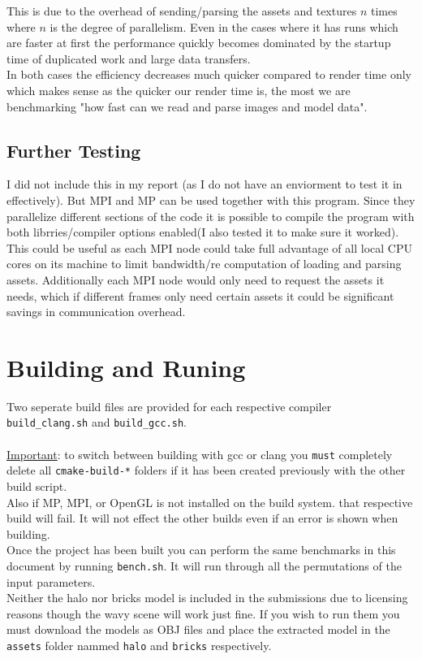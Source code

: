 \documentclass[12pt]{article}
\begin{document}
This is due to the overhead of sending/parsing the assets and textures $n$ times where $n$ is the degree of parallelism. Even in the cases where it has runs which are faster at first the performance quickly becomes dominated by the startup time of duplicated work and large data transfers. \\

In both cases the efficiency decreases much quicker compared to render time only which makes sense as the quicker our render time is, the most we are benchmarking "how fast can we read and parse images and model data". 

\subsection{Further Testing}
I did not include this in my report (as I do not have an enviorment to test it in effectively). But MPI and MP can be used together with this program. Since they parallelize different sections of the code it is possible to compile the program with both librries/compiler options enabled(I also tested it to make sure it worked). This could be useful as each MPI node could take full advantage of all local CPU cores on its machine to limit bandwidth/re computation of loading and parsing assets. Additionally each MPI node would only need to request the assets it needs, which if different frames only need  certain assets it could be significant savings in communication overhead.

\section{Building and Runing}

Two seperate build files are provided for each respective compiler \texttt{build\_clang.sh} and \texttt{build\_gcc.sh}. \\
\\
\underline{Important}: to switch between building with gcc or clang you \texttt{must} completely delete all \texttt{cmake-build-*} folders if it has been created previously with the other build script.\\

Also if MP, MPI, or OpenGL is not installed on the build system. that respective build will fail. It will not effect the other builds even if an error is shown when building.\\

Once the project has been built you can perform the same benchmarks in this document by running \texttt{bench.sh}. It will run through all the permutations of the input parameters.\\

Neither the halo nor bricks model is included in the submissions due to licensing reasons though the wavy scene will work just fine. If you wish to run them you must download the models \cite{halo-model} \cite{bricks-model} as OBJ files and place the extracted model in the \texttt{assets} folder nammed \texttt{halo} and \texttt{bricks} respectively.


\nocite{*}


\end{document}
